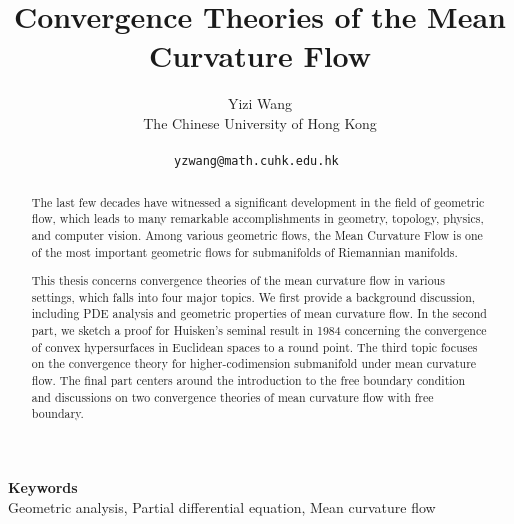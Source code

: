 \documentclass[a4paper]{article} %
\date{} %
\def\keywords#1{\begin{center}{\bf Keywords}\\{#1}\end{center}} %
\begin{document}
\title{Convergence Theories of the Mean Curvature Flow}

\author{Yizi Wang \\ %
       The Chinese University of Hong Kong \\ \\ %
       \tt{yzwang@math.cuhk.edu.hk} %
}%


\maketitle

\thispagestyle{empty}




\begin{abstract}

       The last few decades have witnessed a significant development in the field of geometric flow, which leads to many remarkable accomplishments in geometry, topology, physics, and computer vision. Among various geometric flows, the Mean Curvature Flow is one of the most important geometric flows for submanifolds of Riemannian manifolds.

       This thesis concerns convergence theories of the mean curvature flow in various settings, which falls into four major topics. We first provide a background discussion, including PDE analysis and geometric properties of mean curvature flow. In the second part, we sketch a proof for Huisken's seminal result in 1984 concerning the convergence of convex hypersurfaces in Euclidean spaces to a round point. The third topic focuses on the convergence theory for higher-codimension submanifold under mean curvature flow. The final part centers around the introduction to the free boundary condition and discussions on two convergence theories of mean curvature flow with free boundary.

\end{abstract}

\keywords{Geometric analysis, Partial differential equation, Mean curvature flow} %






\end{document}
